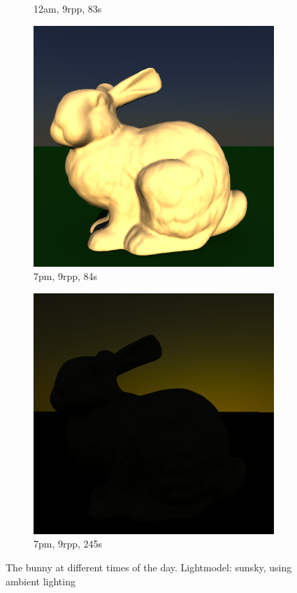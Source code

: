 \begin{figure}[h]
\begin{subfigure}[b]{0.4\textwidth}
		\caption{12am, 9rpp, 83s}
	\end{subfigure}
	\begin{subfigure}[b]{0.4\textwidth}
		\includegraphics[width=\textwidth]{week4/bunny_ambient_9rpp_84s_17.png}
		\caption{7pm, 9rpp, 84s}
	\end{subfigure}
	\begin{subfigure}[b]{0.4\textwidth}
		\includegraphics[width=\textwidth]{week4/bunny_ambient_9rpp_245s_19.png}
		\caption{7pm, 9rpp, 245s}
	\end{subfigure}
	
	\caption{The bunny at different times of the day. Lightmodel: sunsky, using ambient lighting}
	\label{fig:bunnydaytimesambient}
 \end{figure}
 

